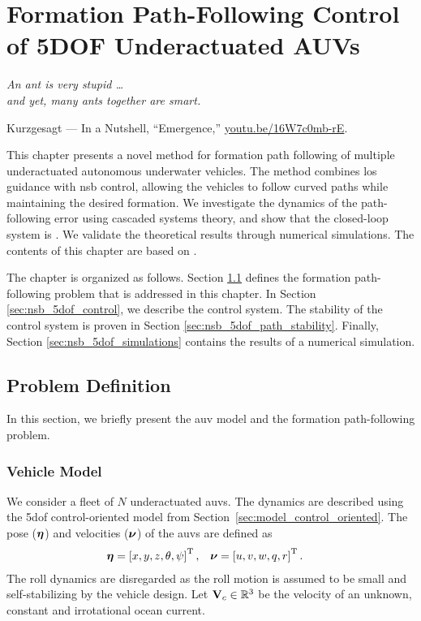 \chapter{Formation Path-Following Control of 5DOF Underactuated AUVs}
\label{chap:5dof_nsb}

\setlength{\epigraphwidth}{0.55\textwidth}
\epigraph{\it
    An ant is very stupid \dots \\ and yet, many ants together are smart.
}{
    Kurzgesagt --- In a Nutshell, ``Emergence,'' \url{youtu.be/16W7c0mb-rE}.
}

This chapter presents a novel method for formation path following of multiple underactuated autonomous underwater vehicles.
The method combines \acrlong{los} guidance with \acrlong{nsb} control, allowing the vehicles to follow curved paths while maintaining the desired formation.
We investigate the dynamics of the path-following error using cascaded systems theory, and show that the closed-loop system is .
We validate the theoretical results through numerical simulations.
The contents of this chapter are based on \cite{matouvs_formation_2022}.

The chapter is organized as follows.
Section \ref{sec:nsb_5dof_model} defines the formation path-following problem that is addressed in this chapter.
In Section \ref{sec:nsb_5dof_control}, we describe the control system.
The stability of the control system is proven in Section \ref{sec:nsb_5dof_path_stability}.
Finally, Section \ref{sec:nsb_5dof_simulations} contains the results of a numerical simulation.

\section{Problem Definition}
\label{sec:nsb_5dof_model}
In this section, we briefly present the \gls{auv} model and the formation path-following problem.

\subsection{Vehicle Model}
We consider a fleet of $N$ underactuated \glspl{auv}.
The dynamics are described using the 5\gls{dof} control-oriented model from Section~\ref{sec:model_control_oriented}.
The pose ($\bm{\eta}$) and velocities ($\bm{\nu}$) of the \glspl{auv} are defined as
\begin{align}
    \bm{\eta} &= \left[x, y, z, \theta, \psi\right]^{\mathrm{T}}, &
    \bm{\nu} &= \left[u, v, w, q, r\right]^{\mathrm{T}}.
\end{align}
The roll dynamics are disregarded as the roll motion is assumed to be small and self-stabilizing by the vehicle design.
Let $\mathbf{V}_c \in \mathbb{R}^3$ be the velocity of an unknown, constant and irrotational ocean current.

